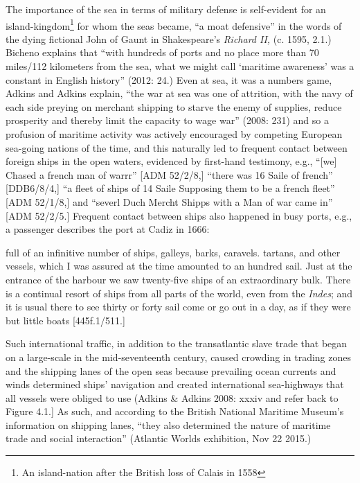 \begin{styleStandard}
The importance of the sea in terms of military defense is self-evident for an island-kingdom\footnote{ An island-nation after the British loss of Calais in 1558} for whom the seas became, “a moat defensive” in the words of the dying fictional John of Gaunt in Shakespeare’s \textit{Richard II, }(c. 1595, 2.1.) Bicheno explains that “with hundreds of ports and no place more than 70 miles/112 kilometers from the sea, what we might call ‘maritime awareness’ was a constant in English history” (2012: 24.) Even at sea, it was a numbers game, Adkins and Adkins explain, “the war at sea was one of attrition, with the navy of each side preying on merchant shipping to starve the enemy of supplies, reduce prosperity and thereby limit the capacity to wage war” (2008: 231) and so a profusion of maritime activity was actively encouraged by competing European sea-going nations of the time, and this naturally led to frequent contact between foreign ships in the open waters, evidenced by first-hand testimony, e.g., “[we] Chased a french man of warrr” [ADM 52/2/8,] “there was 16 Saile of french” [DDB6/8/4,] “a fleet of ships of 14 Saile Supposing them to be a french fleet” [ADM 52/1/8,] and “severl Duch Mercht Shipps with a Man of war came in” [ADM 52/2/5.] Frequent contact between ships also happened in busy ports, e.g., a passenger describes the port at Cadiz in 1666:
\end{styleStandard}

\begin{styleStandard}
full of an infinitive number of ships, galleys, barks, caravels. tartans, and other vessels, which I was assured at the time amounted to an hundred sail. Just at the entrance of the harbour we saw twenty-five ships of an extraordinary bulk. There is a continual resort of ships from all parts of the world, even from the \textit{Indes}; and it is usual there to see thirty or forty sail come or go out in a day, as if they were but little boats [445f.1/511.] 
\end{styleStandard}

\begin{styleStandard}
Such international traffic, in addition to the transatlantic slave trade that began on a large-scale in the mid-seventeenth century, caused crowding in trading zones and the shipping lanes of the open seas because prevailing ocean currents and winds determined ships’ navigation and created international sea-highways that all vessels were obliged to use (Adkins \& Adkins 2008: xxxiv and refer back to Figure 4.1.] As such, and according to the British National Maritime Museum’s information on shipping lanes, “they also determined the nature of maritime trade\textit{ }and social interaction” (Atlantic Worlds exhibition, Nov 22 2015.) \ 
\end{styleStandard}

